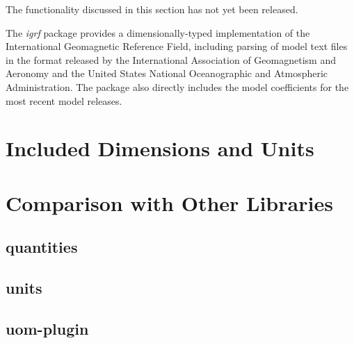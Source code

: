 \documentclass[11pt]{report}
\newcommand{\packagename}[1]{\textit{#1}}
\newcommand{\prerelease}{\begin{framed}
The functionality discussed in this section has not yet been released.
\end{framed}}
\begin{document}
\prerelease{}

The \packagename{igrf} package provides a dimensionally-typed implementation of the International Geomagnetic
Reference Field, including parsing of model text files in the format released by the International Association of
Geomagnetism and Aeronomy and the United States National Oceanographic and Atmospheric Administration. The
package also directly includes the model coefficients for the most recent model releases.

\chapter{Included Dimensions and Units}

\chapter{Comparison with Other Libraries}

\section{quantities}
\section{units}
\section{uom-plugin}
\end{document}

